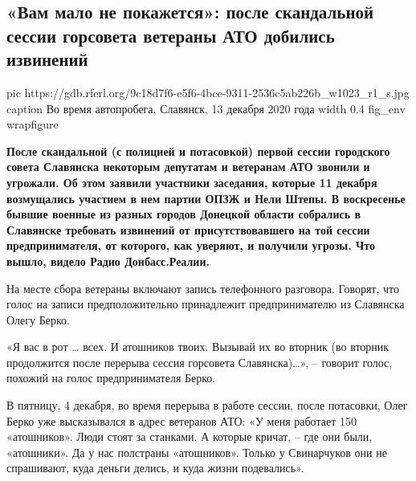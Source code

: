  
 
 
 
 
 
\subsection{«Вам мало не покажется»: после скандальной сессии горсовета ветераны АТО добились извинений}
\label{sec:14_12_2020.news.radiosvoboda.1.slavjansk_ato_izvinenija}

\ifcmt
pic https://gdb.rferl.org/9c18d7f6-e5f6-4bce-9311-2536c5ab226b_w1023_r1_s.jpg
caption Во время автопробега, Славянск, 13 декабря 2020 года
width 0.4
fig_env wrapfigure
\fi

\textbf{После скандальной (с полицией и потасовкой) первой сессии городского совета
Славянска некоторым депутатам и ветеранам АТО звонили и угрожали. Об этом
заявили участники заседания, которые 11 декабря возмущались участием в нем
партии ОПЗЖ и Нели Штепы. В воскресенье бывшие военные из разных городов
Донецкой области собрались в Славянске требовать извинений от присутствовавшего
на той сессии предпринимателя, от которого, как уверяют, и получили угрозы. Что
вышло, видело Радио Донбасс.Реалии.}

На месте сбора ветераны включают запись телефонного разговора. Говорят, что
голос на записи предположительно принадлежит предпринимателю из Славянска Олегу
Берко.

«Я вас в рот … всех. И атошников твоих. Вызывай их во вторник (во вторник
продолжится после перерыва сессия горсовета Славянска)…», – говорит голос,
похожий на голос предпринимателя Берко.


В пятницу, 4 декабря, во время перерыва в работе сессии, после потасовки, Олег
Берко уже высказывался в адрес ветеранов АТО: «У меня работает 150 «атошников».
Люди стоят за станками. А которые кричат, – где они были, «атошники». Да у нас
полстраны «атошников». Только у Свинарчуков они не спрашивают, куда деньги
делись, и куда жизни подевались».

